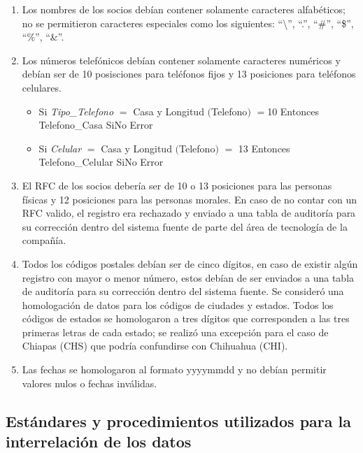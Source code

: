 \begin{enumerate}

\item Los nombres de los socios debían contener solamente caracteres
  alfabéticos; no se permitieron caracteres especiales como los siguientes:
  ``\textbackslash'', ``.'', ``\#'', ``\$'', ``\%'', ``\&''.

\item Los números telefónicos debían contener solamente caracteres numéricos y
  debían ser de 10 posisciones para teléfonos fijos y 13 posiciones para
  teléfonos celulares.

  \begin{itemize}
  \item Si \textit{Tipo\_Telefono} $=$ Casa y Longitud $($Telefono$)$ $=$10
    Entonces Telefono\_Casa SiNo Error
  \item Si \textit{Celular} $=$ Casa y Longitud $($Telefono$)$ $=$ 13 Entonces
    Telefono\_Celular SiNo Error
  \end{itemize}

\item El RFC de los socios debería ser de 10 o 13 posiciones para las personas
  físicas y 12 posiciones para las personas morales. En caso de no contar con un
  RFC valido, el registro era rechazado y enviado a una tabla de auditoría para
  su corrección dentro del sistema fuente de parte del área de tecnología de la
  compañía.

\item Todos los códigos postales debían ser de cinco dígitos, en caso de existir
  algún registro con mayor o menor número, estos debían de ser enviados a una
  tabla de auditoría para su corrección dentro del sistema fuente. Se consideró
  una homologación de datos para los códigos de ciudades y estados. Todos los
  códigos de estados se homologaron a tres dígitos que corresponden a las tres
  primeras letras de cada estado; se realizó una excepción para el caso de
  Chiapas (CHS) que podría confundirse con Chihuahua (CHI).

\item Las fechas se homologaron al formato yyyymmdd y no debían permitir valores
  nulos o fechas inválidas.

\end{enumerate}

\subsection{Estándares y procedimientos utilizados para la interrelación de los datos}

